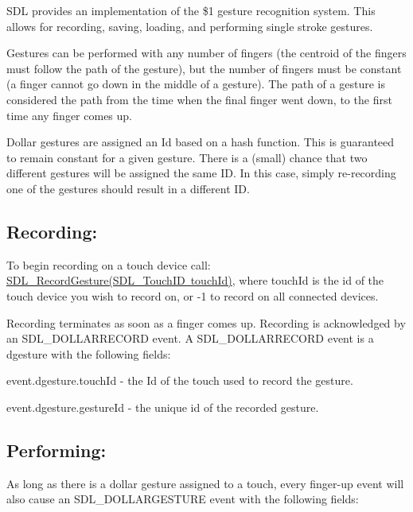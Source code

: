 S\+DL provides an implementation of the \$1 gesture recognition system. This allows for recording, saving, loading, and performing single stroke gestures.

Gestures can be performed with any number of fingers (the centroid of the fingers must follow the path of the gesture), but the number of fingers must be constant (a finger cannot go down in the middle of a gesture). The path of a gesture is considered the path from the time when the final finger went down, to the first time any finger comes up.

Dollar gestures are assigned an Id based on a hash function. This is guaranteed to remain constant for a given gesture. There is a (small) chance that two different gestures will be assigned the same ID. In this case, simply re-\/recording one of the gestures should result in a different ID.

\subsection*{Recording\+: }

To begin recording on a touch device call\+: \mbox{\hyperlink{_s_d_l__gesture_8h_ad06776e2e199d5d48e466a0ecbbb06c3}{S\+D\+L\+\_\+\+Record\+Gesture(\+S\+D\+L\+\_\+\+Touch\+I\+D touch\+Id)}}, where touch\+Id is the id of the touch device you wish to record on, or -\/1 to record on all connected devices.

Recording terminates as soon as a finger comes up. Recording is acknowledged by an S\+D\+L\+\_\+\+D\+O\+L\+L\+A\+R\+R\+E\+C\+O\+RD event. A S\+D\+L\+\_\+\+D\+O\+L\+L\+A\+R\+R\+E\+C\+O\+RD event is a dgesture with the following fields\+:


\begin{DoxyItemize}
\item event.\+dgesture.\+touch\+Id -\/ the Id of the touch used to record the gesture.
\item event.\+dgesture.\+gesture\+Id -\/ the unique id of the recorded gesture.
\end{DoxyItemize}

\subsection*{Performing\+: }

As long as there is a dollar gesture assigned to a touch, every finger-\/up event will also cause an S\+D\+L\+\_\+\+D\+O\+L\+L\+A\+R\+G\+E\+S\+T\+U\+RE event with the following fields\+:


